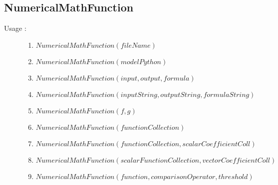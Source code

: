  \newpage 
\subsection{NumericalMathFunction}


\begin{description}

\item[Usage :] \rule{0pt}{1em}
  \begin{enumerate}
  \item $NumericalMathFunction(fileName)$
  \item $NumericalMathFunction(modelPython)$
  \item $NumericalMathFunction(input, output, formula)$
  \item $NumericalMathFunction(inputString, outputString, formulaString)$
  \item $NumericalMathFunction(f,g)$
  \item $NumericalMathFunction(functionCollection)$
  \item $NumericalMathFunction(functionCollection, scalarCoefficientColl)$
  \item $NumericalMathFunction(scalarFunctionCollection, vectorCoefficientColl)$
  \item $NumericalMathFunction(function, comparisonOperator, threshold)$
  \end{enumerate}


\end{description}
